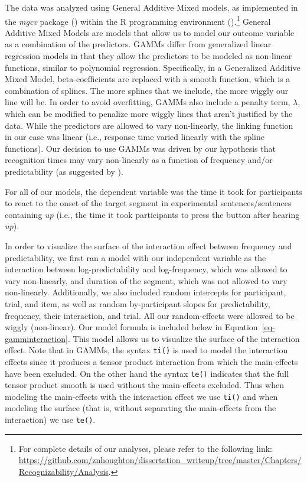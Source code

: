 \documentclass[
  12pt,
  letterpaper,
]{scrreport}
\begin{document}
The data was analyzed using General Additive Mixed models, as
implemented in the \emph{mgcv} package
() within the R programming
environment ().\footnote{For
  complete details of our analyses, please refer to the following link:
  \url{https://github.com/znhoughton/dissertation_writeup/tree/master/Chapters/Recognizability/Analysis}.}
General Additive Mixed Models are models that allow us to model our
outcome variable as a combination of the predictors. GAMMs differ from
generalized linear regression models in that they allow the predictors
to be modeled as non-linear functions, similar to polynomial regression.
Specifically, in a Generalized Additive Mixed Model, beta-coefficients
are replaced with a smooth function, which is a combination of splines.
The more splines that we include, the more wiggly our line will be. In
order to avoid overfitting, GAMMs also include a penalty term,
\(\lambda\), which can be modified to penalize more wiggly lines that
aren't justified by the data. While the predictors are allowed to vary
non-linearly, the linking function in our case was linear (i.e.,
response time varied linearly with the spline functions). Our decision
to use GAMMs was driven by our hypothesis that recognition times may
vary non-linearly as a function of frequency and/or predictability (as
suggested by
).

For all of our models, the dependent variable was the time it took for
participants to react to the onset of the target segment in experimental
sentences/sentences containing \emph{up} (i.e., the time it took
participants to press the button after hearing \emph{up}).

In order to visualize the surface of the interaction effect between
frequency and predictability, we first ran a model with our independent
variable as the interaction between log-predictability and
log-frequency, which was allowed to vary non-linearly, and duration of
the segment, which was not allowed to vary non-linearly. Additionally,
we also included random intercepts for participant, trial, and item, as
well as random by-participant slopes for predictability, frequency,
their interaction, and trial. All our random-effects were allowed to be
wiggly (non-linear). Our model formula is included below in
Equation~\ref{eq-gamminteraction}. This model allows us to visualize the
surface of the interaction effect. Note that in GAMMs, the syntax
\texttt{ti()} is used to model the interaction effects since it produces
a tensor product interaction from which the main-effects have been
excluded. On the other hand the syntax \texttt{te()} indicates that the
full tensor product smooth is used without the main-effects excluded.
Thus when modeling the main-effects with the interaction effect we use
\texttt{ti()} and when modeling the surface (that is, without separating
the main-effects from the interaction) we use \texttt{te()}.
\end{document}
